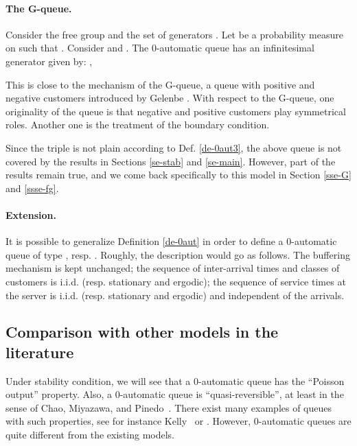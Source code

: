 \documentclass[11pt,a4paper]{article}
\theoremstyle{remark}
\begin{document}
\paragraph{The G-queue.}

Consider the free group  and the
set of generators . Let  be a probability
measure on
 such that . Consider  and . The 0-automatic queue
 has an infinitesimal
generator  given by: ,

This is close to the mechanism of the G-queue, a queue with positive and
negative customers introduced by Gelenbe \cite{gele91,GePu}.
With respect to the G-queue, one originality of the
 queue is that negative and
positive customers play
symmetrical roles. Another one is the treatment of the boundary
condition. 

\medskip

Since the triple  is not plain according to
Def. \ref{de-0aut3}, the above queue is not covered by the results in
Sections \ref{se-stab} and \ref{se-main}. However, part of the results
remain true, and we come back specifically to this model in 
Section \ref{sse-G} and \ref{ssse-fg}. 







\paragraph{Extension.}
It is possible to generalize Definition \ref{de-0aut} in
order to define a 0-automatic queue of type , resp.
.  Roughly, the description would go as follows. The
buffering mechanism is kept unchanged; the sequence of inter-arrival
times and classes of customers is i.i.d. (resp. stationary and ergodic);
the sequence of service times at the server is i.i.d. (resp. stationary
and ergodic) and independent of the arrivals.

\subsection{Comparison with other models in the literature}

Under stability condition, we will see that a 0-automatic queue has
the ``Poisson output'' property. Also, a 0-automatic queue is
``quasi-reversible'', at least in the sense of Chao, Miyazawa, and
Pinedo~\cite[Definition 3.4]{CMPi}.  
There exist many examples of queues with such properties, see for
instance Kelly~\cite{kell79} or \cite{CMPi}. 
However, 0-automatic queues are
quite different from the existing models. 
\end{document}
